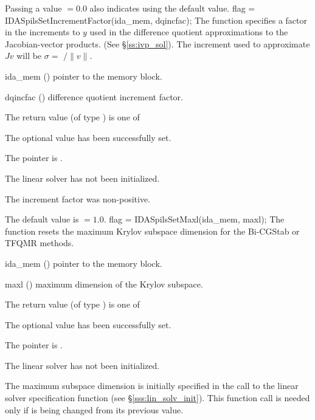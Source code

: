 {{  Passing a value $ = 0.0$ also indicates using the default value.
}
{
  flag = IDASpilsSetIncrementFactor(ida\_mem, dqincfac);
}
{
  The function  specifies a factor in the 
  increments to $y$ used in the difference quotient approximations 
  to the Jacobian-vector products.  (See \S\ref{ss:ivp_sol}).  The increment
  used to approximate $Jv$ will be $\sigma = $ $/\|v\|$.
}
{
  \begin{args}[dqincfac]
  \item[ida\_mem] ()
    pointer to the {\idas} memory block.
  \item[dqincfac] ()
    difference quotient increment factor.
  \end{args}
}
{
  The return value  (of type ) is one of
  \begin{args}
  \item[\Id{IDASPILS\_SUCCESS}] 
    The optional value has been successfully set.
  \item[\Id{IDASPILS\_MEM\_NULL}]
    The  pointer is .
  \item[\Id{IDASPILS\_LMEM\_NULL}]
    The {\idaspils} linear solver has not been initialized.
  \item[\Id{IDASPILS\_ILL\_INPUT}]
    The increment factor was non-positive.
  \end{args}
}
{
  The default value is  $=1.0$.
}
{
  flag = IDASpilsSetMaxl(ida\_mem, maxl);
}
{
  The function  resets the maximum Krylov subspace
  dimension for the Bi-CGStab or TFQMR 
  methods.
}
{
  \begin{args}
  \item[ida\_mem] ()
    pointer to the {\idas} memory block.
  \item[maxl] ()
    maximum dimension of the Krylov subspace.
  \end{args}
}
{
  The return value  (of type ) is one of
  \begin{args}
  \item[\Id{IDASPILS\_SUCCESS}] 
    The optional value has been successfully set.
  \item[\Id{IDASPILS\_MEM\_NULL}]
    The  pointer is .
  \item[\Id{IDASPILS\_LMEM\_NULL}]
    The {\idaspils} linear solver has not been initialized.
  \end{args}
}
{
  The maximum subspace dimension is initially specified in the call
  to the linear solver specification function (see \S\ref{sss:lin_solv_init}). 
  This function call is needed only if  is being changed from its 
  previous value.

}}
